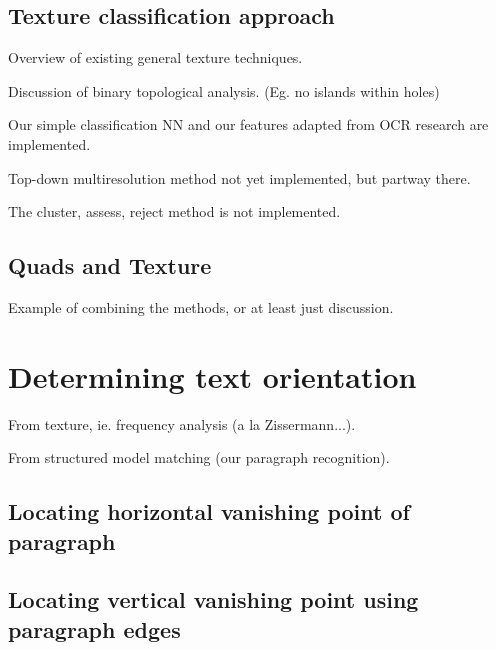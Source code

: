 \section{Texture classification approach} %

Overview of existing general texture techniques.

Discussion of binary topological analysis.  (Eg. no islands within holes)

Our simple classification NN and our features adapted from OCR research are implemented.

Top-down multiresolution method not yet implemented, but partway there.

The cluster, assess, reject method is not implemented.



\section{Quads and Texture} %

Example of combining the methods, or at least just discussion.




\chapter{Determining text orientation}




From texture, ie. frequency analysis (a la Zissermann...).

From structured model matching (our paragraph recognition).



\section{Locating horizontal vanishing point of paragraph} %

\section{Locating vertical vanishing point using paragraph edges} %

